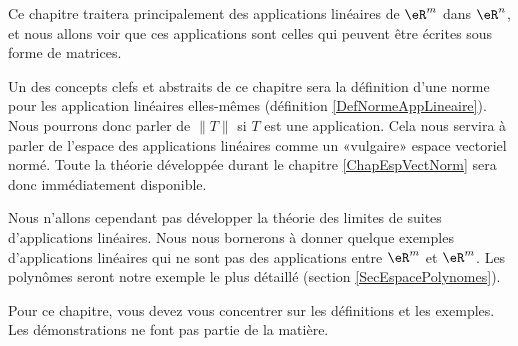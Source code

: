 Ce chapitre traitera principalement des applications linéaires de $\eR^m$ dans $\eR^n$, et nous allons voir que ces applications sont celles qui peuvent être écrites sous forme de matrices.

Un des concepts clefs et abstraits de ce chapitre sera la définition d'une norme pour les application linéaires elles-mêmes (définition \ref{DefNormeAppLineaire}). Nous pourrons donc parler de $\| T \|$ si $T$ est une application. Cela nous servira à parler de l'espace des applications linéaires comme un «vulgaire» espace vectoriel normé. Toute la théorie développée durant le chapitre \ref{ChapEspVectNorm} sera donc immédiatement disponible.

Nous n'allons cependant pas développer la théorie des limites de suites d'applications linéaires. Nous nous bornerons à donner quelque exemples d'applications linéaires qui ne sont pas des applications entre $\eR^m$ et $\eR^m$. Les polynômes seront notre exemple le plus détaillé (section \ref{SecEspacePolynomes}).

Pour ce chapitre, vous devez vous concentrer sur les définitions et les exemples. Les démonstrations ne font pas partie de la matière.

